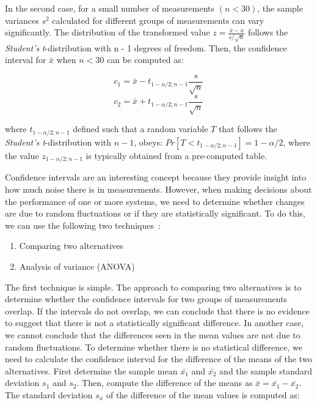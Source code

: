 In the second case, for a small number of measurements \((n < 30)\), the
sample variances \(s^2\) calculated for different groups of measurements can
vary significantly. The distribution of the transformed value \(z =
   \frac{\bar{x} - x}{s/\sqrt{n}}\) follows the \emph{Student's} \emph{t}-distribution
with n - 1 degrees of freedom. Then, the confidence interval for \(\bar{x}\)
when \(n < 30\) can be computed as:

\begin{equation}
c_1 = \bar{x} - t_{1-\alpha/2;n-1}\frac{s}{\sqrt{n}}
\end{equation}
\begin{equation}
c_2 = \bar{x} + t_{1-\alpha/2;n-1}\frac{s}{\sqrt{n}}
\end{equation}

where \(t_{1 - \alpha/2;n-1}\) defined such that a random variable \(T\) that
follows the \emph{Student's t}-distribution with \(n - 1\), obeys: \(Pr[T < t_{1 -
   \alpha/2;n - 1}] = 1 - \alpha/2\), where the value \(z_{1 - \alpha/2;n - 1}\)
is typically obtained from a pre-computed table.

Confidence intervals are an interesting concept because they provide insight into how much noise there is in measurements. However, when making decisions about the performance of one or more systems, we need to determine whether changes are due to random fluctuations or if they are statistically significant. To do this, we can use the following two techniques~\cite{DBLP_conf_oopsla_GeorgesBE07, lilja2005measuring}:

\begin{enumerate}
\item Comparing two alternatives
\item Analysis of variance (ANOVA)
\end{enumerate}

The first technique is simple. The approach to comparing two alternatives is
to determine whether the confidence intervals for two groups of measurements
overlap. If the intervals do not overlap, we can conclude that there is no
evidence to suggest that there is not a statistically significant
difference. In another case, we cannot conclude that the differences seen in
the mean values are not due to random fluctuations. To determine whether
there is no statistical difference, we need to calculate the confidence
interval for the difference of the means of the two alternatives. First
determine the sample mean \(\bar{x_1}\) and \(\bar{x_2}\) and the sample
standard deviation \(s_1\) and \(s_2\). Then, compute the difference of the
means as \(\bar{x} = \bar{x_1} - \bar{x_2}\). The standard deviation \(s_x\)
of the difference of the mean values is computed as:

